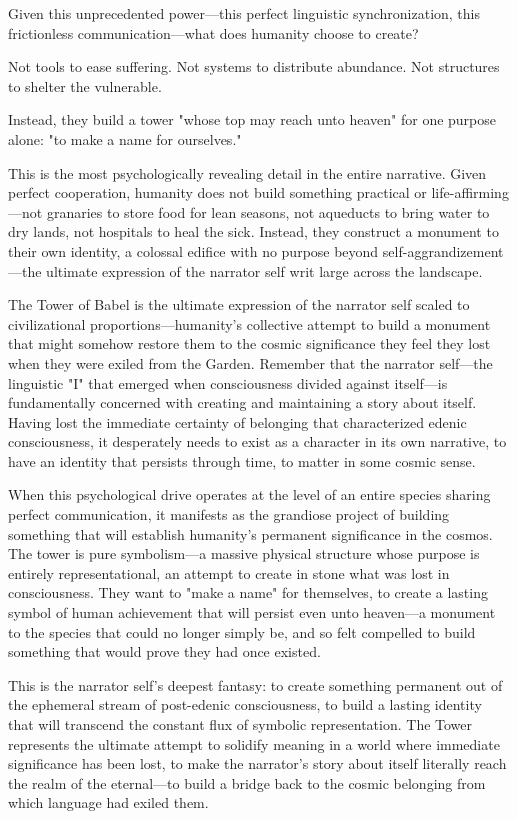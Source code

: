 Given this unprecedented power—this perfect linguistic synchronization, this frictionless communication—what does humanity choose to create?

Not tools to ease suffering. Not systems to distribute abundance. Not structures to shelter the vulnerable.

Instead, they build a tower "whose top may reach unto heaven" for one purpose alone: "to make a name for ourselves." 

This is the most psychologically revealing detail in the entire narrative. Given perfect cooperation, humanity does not build something practical or life-affirming—not granaries to store food for lean seasons, not aqueducts to bring water to dry lands, not hospitals to heal the sick. Instead, they construct a monument to their own identity, a colossal edifice with no purpose beyond self-aggrandizement—the ultimate expression of the narrator self writ large across the landscape.

The Tower of Babel is the ultimate expression of the narrator self scaled to civilizational proportions—humanity's collective attempt to build a monument that might somehow restore them to the cosmic significance they feel they lost when they were exiled from the Garden. Remember that the narrator self—the linguistic "I" that emerged when consciousness divided against itself—is fundamentally concerned with creating and maintaining a story about itself. Having lost the immediate certainty of belonging that characterized edenic consciousness, it desperately needs to exist as a character in its own narrative, to have an identity that persists through time, to matter in some cosmic sense.

When this psychological drive operates at the level of an entire species sharing perfect communication, it manifests as the grandiose project of building something that will establish humanity's permanent significance in the cosmos. The tower is pure symbolism—a massive physical structure whose purpose is entirely representational, an attempt to create in stone what was lost in consciousness. They want to "make a name" for themselves, to create a lasting symbol of human achievement that will persist even unto heaven—a monument to the species that could no longer simply be, and so felt compelled to build something that would prove they had once existed.

This is the narrator self's deepest fantasy: to create something permanent out of the ephemeral stream of post-edenic consciousness, to build a lasting identity that will transcend the constant flux of symbolic representation. The Tower represents the ultimate attempt to solidify meaning in a world where immediate significance has been lost, to make the narrator's story about itself literally reach the realm of the eternal—to build a bridge back to the cosmic belonging from which language had exiled them.

